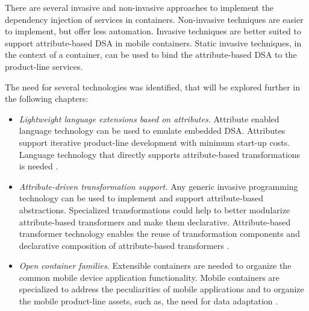 There are several invasive and non-invasive approaches to implement the dependency injection of services in containers. Non-invasive techniques are easier to implement, but offer less automation. Invasive techniques are better suited to support attribute-based DSA in mobile containers. Static invasive techniques, in the context of a container, can be used to bind the attribute-based DSA to the product-line services.

The need for several technologies was identified, that will be explored further in the following chapters:

\begin{itemize}
\item \textit{Lightweight language extensions based on attributes.} Attribute enabled language tech\-no\-lo\-gy can be used to emulate embedded DSA. Attributes support iterative product-line development with minimum start-up costs. Language technology that directly supports attribute-based transformations is needed .

\item \textit{Attribute-driven transformation support.} Any generic invasive programming technology can be used to implement and support attribute-based abstractions. Specialized transformations could help to better modularize attribute-based transformers and make them declarative. Attribute-based transformer technology enables the reuse of transformation components and declarative composition of attribute-based transformers .

\item \textit{Open container families.} Extensible containers are needed to organize the common mobile device application functionality. Mobile containers are specialized to address the peculiarities of mobile applications and to organize the mobile product-line assets, such as, the need for data adaptation .

\end{itemize}
